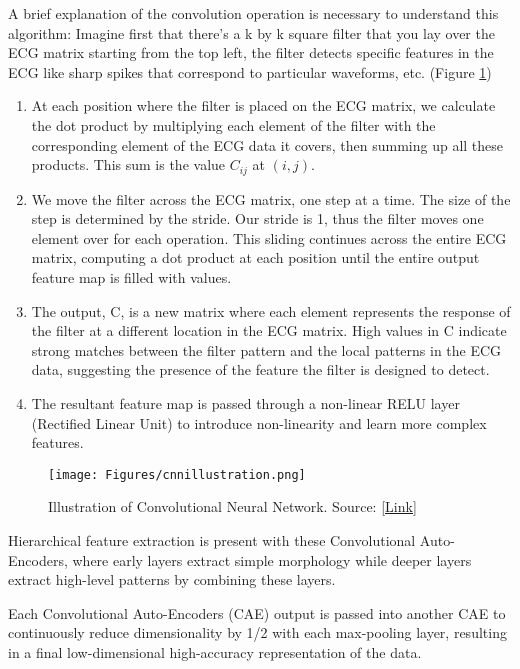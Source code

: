 \documentclass[
	a4paper, 
	10pt, 
	twoside, 
]{LTJournalArticle}
\begin{document}
A brief explanation of the convolution operation is necessary to understand this algorithm:
Imagine first that there's a k by k square filter that you lay over the ECG matrix starting from the top left, the filter detects specific features in the ECG like sharp spikes that correspond to particular waveforms, etc. (Figure \ref{fig:cnn})
\begin{enumerate}
    \item At each position where the filter is placed on the ECG matrix, we calculate the dot product by multiplying each element of the filter with the corresponding element of the ECG data it covers, then summing up all these products. This sum is the value $C_{ij}$ at $(i,j)$. 
    \item We move the filter across the ECG matrix, one step at a time. The size of the step is determined by the stride. Our stride is 1, thus the filter moves one element over for each operation. This sliding continues across the entire ECG matrix, computing a dot product at each position until the entire output feature map is filled with values.
    \item The output, C, is a new matrix where each element represents the response of the filter at a different location in the ECG matrix. High values in C indicate strong matches between the filter pattern and the local patterns in the ECG data, suggesting the presence of the feature the filter is designed to detect.
    \item The resultant feature map is passed through a non-linear RELU layer (Rectified Linear Unit) to introduce non-linearity and learn more complex features. 
\end{enumerate}
\begin{figure}[!h]
    \centering
    \texttt{[image: Figures/cnnillustration.png]}
    \caption{Illustration of Convolutional Neural Network. Source: \href{https://towardsdatascience.com/convolutional-neural-network-cnn-architecture-explained-in-plain-english-using-simple-diagrams-e5de17eacc8f}{[Link]}}
    \label{fig:cnn}
\end{figure}
Hierarchical feature extraction is present with these Convolutional Auto-Encoders, where early layers extract simple morphology while deeper layers extract high-level patterns by combining these layers. 

Each Convolutional Auto-Encoders (CAE) output is passed into another CAE to continuously reduce dimensionality by 1/2 with each max-pooling layer, resulting in a final low-dimensional high-accuracy representation of the data. 
\end{document}
